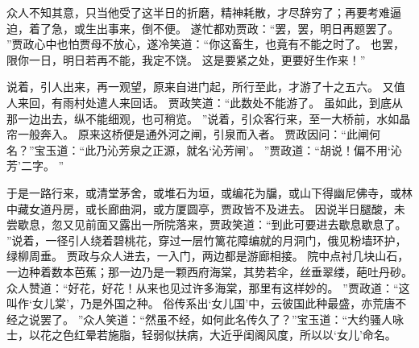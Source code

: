 众人不知其意，只当他受了这半日的折磨，精神耗散，才尽辞穷了；再要考难逼迫，着了急，或生出事来，倒不便。
遂忙都劝贾政：“罢，罢，明日再题罢了。
”贾政心中也怕贾母不放心，遂冷笑道：“你这畜生，也竟有不能之时了。
也罢，限你一日，明日若再不能，我定不饶。
这是要紧之处，更要好生作来！”\par
说着，引人出来，再一观望，原来自进门起，所行至此，才游了十之五六。
又值人来回，有雨村处遣人来回话。
贾政笑道：“此数处不能游了。
虽如此，到底从那一边出去，纵不能细观，也可稍览。
”说着，引众客行来，至一大桥前，水如晶帘一般奔入。
原来这桥便是通外河之闸，引泉而入者。
贾政因问：“此闸何名？”宝玉道：“此乃沁芳泉之正源，就名‘沁芳闸’。
”贾政道：“胡说！偏不用‘沁芳’二字。
”\par
于是一路行来，或清堂茅舍，或堆石为垣，或编花为牖，或山下得幽尼佛寺，或林中藏女道丹房，或长廊曲洞，或方厦圆亭，贾政皆不及进去。
因说半日腿酸，未尝歇息，忽又见前面又露出一所院落来，贾政笑道：“到此可要进去歇息歇息了。
”说着，一径引人绕着碧桃花，穿过一层竹篱花障编就的月洞门，俄见粉墙环护，绿柳周垂。
贾政与众人进去，一入门，两边都是游廊相接。
院中点衬几块山石，一边种着数本芭蕉；那一边乃是一颗西府海棠，其势若伞，丝垂翠缕，葩吐丹砂。
众人赞道：“好花，好花！从来也见过许多海棠，那里有这样妙的。
”贾政道：“这叫作‘女儿棠’，乃是外国之种。
俗传系出‘女儿国’中，云彼国此种最盛，亦荒唐不经之说罢了。
”众人笑道：“然虽不经，如何此名传久了？”宝玉道：“大约骚人咏士，以花之色红晕若施脂，轻弱似扶病，大近乎闺阁风度，所以以‘女儿’命名。
